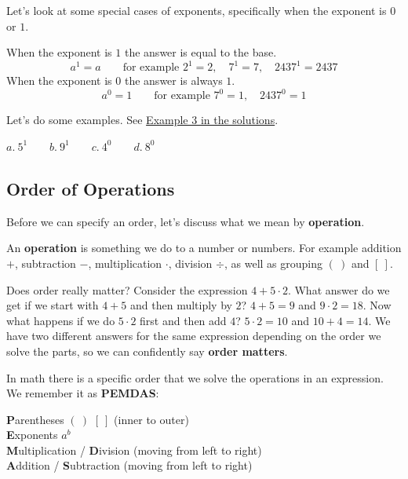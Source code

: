 \documentclass[letter]{article}
\newenvironment{keybox}
  {\begin{lrbox}{\keyboxsave}\begin{minipage}{\dimexpr\linewidth-2\fboxsep-2\fboxrule\relax}}
  {\end{minipage}\end{lrbox}\par\noindent\fbox{\usebox{\keyboxsave}}\par}
\newcommand{\exbox}[1]{\fbox{\textbf{Example #1}}}
\newcommand{\chp}{}
\newcommand{\seesol}[1]{See \hyperref[sec:\chp ex#1]{Example #1 in the solutions}.}
\begin{document}
Let's look at some special cases of exponents, specifically when the exponent is $0$ or $1$.

\begin{keybox}
When the exponent is $1$ the answer is equal to the base.
\[a^1=a\qquad\text{for example }2^1=2,\quad7^1=7,\quad2437^1=2437\]
When the exponent is $0$ the answer is always $1$.
\[a^0=1\qquad\text{for example }7^0=1,\quad2437^0=1\]
\end{keybox}

\exbox{3} Let's do some examples. \seesol{3}
\begin{center}
$a.\ 5^1\qquad b.\ 9^1\qquad c.\ 4^0\qquad d.\ 8^0$
\end{center}

\subsection{Order of Operations}

Before we can specify an order, let's discuss what we mean by \textbf{operation}.

\begin{keybox}
An \textbf{operation} is something we do to a number or numbers. For example addition $+$, subtraction $-$, multiplication $\cdot$, division $\div$, as well as grouping $(\ )$ and $[\ ]$.
\end{keybox}

Does order really matter? Consider the expression $4+5\cdot2$. What answer do we get if we start with $4+5$ and then multiply by $2$? $4+5=9$ and $9\cdot2=18$. Now what happens if we do $5\cdot2$ first and then add $4$? $5\cdot2=10$ and $10+4=14$. We have two different answers for the same expression depending on the order we solve the parts, so we can confidently say \textbf{order matters}.

In math there is a specific order that we solve the operations in an expression. We remember it as \textbf{PEMDAS}:

\begin{keybox}
\textbf{P}arentheses $(\ )$ $[\ ]$ (inner to outer)\\
\textbf{E}xponents $a^b$\\
\textbf{M}ultiplication / \textbf{D}ivision (moving from left to right)\\
\textbf{A}ddition / \textbf{S}ubtraction (moving from left to right)
\end{keybox}
\end{document}
